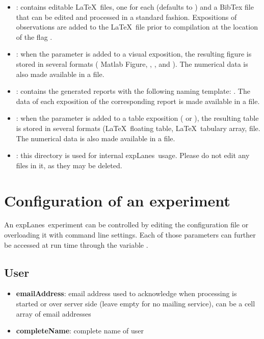 \documentclass[a4paper,fleqn]{tufte-handout}
\newcommand{\latex}{\LaTeX\ }
\newcommand{\explanes}{\textsf{expLanes}\ }
\begin{document}
\begin{itemize}
\item \textbf{}: contains editable \latex files, one for each  (defaults to ) and a BibTex file that can be edited and processed in a standard fashion. Expositions of observations are added to the \latex file prior to compilation at the location of the flag .
\item \textbf{}: when the  parameter is added to a visual exposition, the resulting figure is stored in several formats ( Matlab Figure, , , and ). The numerical data is also made available in a  file. 
\item \textbf{}: contains the generated reports with the following naming template: . The data of each exposition of the corresponding report is made available in a  file.
\item \textbf{}:  when the  parameter is added to a table exposition ( or ), the resulting table is stored in several formats (\latex floating table, \latex tabulary array,  file. The numerical data is also made available in a  file.
\item \textbf{}: this directory is used for internal \explanes usage. Please do not edit any files in it, as they may be deleted.
\end{itemize}


\section{Configuration of an experiment}
\hypertarget{configuration}{} 

An \explanes experiment can be controlled by editing the configuration file or overloading it with command line settings. Each of those parameters can further be accessed at run time through the variable .

\subsection{User}

\begin{itemize}
\item \textbf{emailAddress}: email address used to acknowledge when processing is started or over server side (leave empty for no mailing service), can be a cell array of email addresses
\item \textbf{completeName}: complete name of user
\end{itemize}
\end{document}
